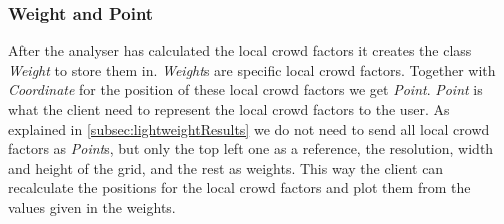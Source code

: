 \subsubsection{Weight and Point}
After the analyser has calculated the local crowd factors it creates the class \emph{Weight} to store them in. \emph{Weight}s are specific local crowd factors. Together with \emph{Coordinate} for the position of these local crowd factors we get \emph{Point}. \emph{Point} is what the client need to represent the local crowd factors to the user. As explained in \cref{subsec:lightweightResults} we do not need to send all local crowd factors as \emph{Point}s, but only the top left one as a reference, the resolution, width and height of the grid, and the rest as weights. This way the client can recalculate the positions for the local crowd factors and plot them from the values given in the weights.


